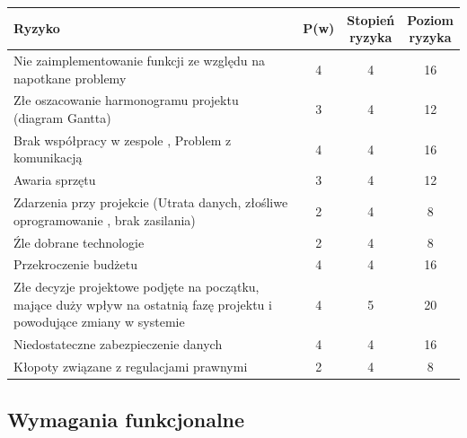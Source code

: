 \documentclass{article}
\begin{document}
\begin{center}
	\begin{tabular}{|p{4cm}|c|c|c|}
		\hline
		Ryzyko & P(w)  & \pbox{2cm}{Stopień \\ ryzyka}  & \pbox{2cm}{Poziom \\ ryzyka} \\ \hline
		Nie zaimplementowanie funkcji ze względu na napotkane problemy & 4 & 4 & 16 \\ \hline
		Złe oszacowanie harmonogramu projektu (diagram Gantta)  & 3 & 4 & 12 \\ \hline
		Brak współpracy w zespole , Problem z komunikacją & 4 & 4 & 16 \\ \hline
		Awaria sprzętu & 3 & 4 & 12 \\ \hline
		Zdarzenia przy projekcie (Utrata danych, złośliwe oprogramowanie , brak zasilania) & 2 & 4 & 8 \\ \hline
		Źle dobrane technologie & 2 & 4 & 8 \\ \hline
		Przekroczenie budżetu & 4 & 4 & 16 \\ \hline
		Złe decyzje projektowe podjęte na początku, mające duży wpływ na ostatnią fazę projektu i powodujące zmiany w systemie & 4 & 5 & 20 \\ \hline
		Niedostateczne zabezpieczenie danych & 4 & 4 & 16 \\ \hline
		Kłopoty związane z regulacjami prawnymi & 2 & 4 & 8 \\ \hline
\end{tabular}
\end{center}

\newpage
\subsection{Wymagania funkcjonalne}
\end{document}
